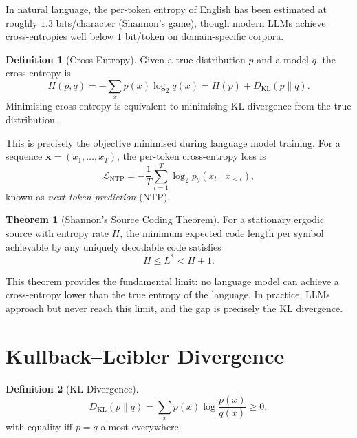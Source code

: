 \documentclass[11pt,a4paper]{book}
\theoremstyle{definition}
\newtheorem{definition}{Definition}[chapter]
\newtheorem{theorem}{Theorem}[chapter]
\begin{document}
In natural language, the per-token entropy of English has been estimated at roughly $1.3$ bits/character (Shannon's game), though modern LLMs achieve cross-entropies well below $1$ bit/token on domain-specific corpora.

\begin{definition}[Cross-Entropy]
	Given a true distribution $p$ and a model $q$, the cross-entropy is
	\begin{equation}
		H(p,q) = -\sum_{x} p(x) \log_2 q(x) = H(p) + D_{\mathrm{KL}}(p \parallel q).
	\end{equation}
	Minimising cross-entropy is equivalent to minimising KL divergence from the true distribution.
\end{definition}

This is precisely the objective minimised during language model training. For a sequence $\mathbf{x} = (x_1, \dots, x_T)$, the per-token cross-entropy loss is
\begin{equation}
	\mathcal{L}_{\mathrm{NTP}} = -\frac{1}{T} \sum_{t=1}^{T} \log_2 p_\theta(x_t \mid x_{<t}),
\end{equation}
known as \emph{next-token prediction} (NTP).

\begin{theorem}[Shannon's Source Coding Theorem]
	For a stationary ergodic source with entropy rate $H$, the minimum expected code length per symbol achievable by any uniquely decodable code satisfies
	\begin{equation}
		H \leq L^* < H + 1.
	\end{equation}
\end{theorem}

This theorem provides the fundamental limit: no language model can achieve a cross-entropy lower than the true entropy of the language. In practice, LLMs approach but never reach this limit, and the gap is precisely the KL divergence.

\section{Kullback--Leibler Divergence}

\begin{definition}[KL Divergence]
	\begin{equation}
		D_{\mathrm{KL}}(p \parallel q) = \sum_{x} p(x) \log \frac{p(x)}{q(x)} \geq 0,
	\end{equation}
	with equality iff $p = q$ almost everywhere.
\end{definition}
\end{document}
